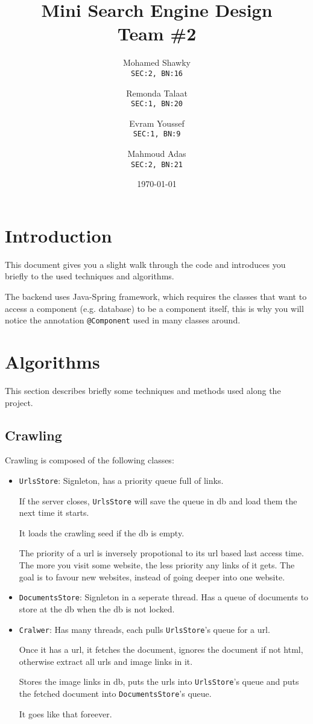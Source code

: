 \documentclass[12pt]{article}
\title{\textbf{Mini Search Engine Design}\\Team \#2}
\author{
  Mohamed Shawky\\
  \small\texttt{SEC:2, BN:16}
  \and
  Remonda Talaat\\
  \small\texttt{SEC:1, BN:20}
  \and
  Evram Youssef\\
  \small\texttt{SEC:1, BN:9}
  \and
  Mahmoud Adas\\
  \small\texttt{SEC:2, BN:21}
}
\date{\today}
\begin{document}
\thispagestyle{empty}

\maketitle
\tableofcontents


\section{Introduction}
This document gives you a slight walk through the code and introduces you briefly to the used techniques and algorithms.

The backend uses Java-Spring framework, which requires the classes that want to access a component (e.g. database) to be a component itself, this is why you will notice the annotation \texttt{@Component} used in many classes around.

\section{Algorithms}
This section describes briefly some techniques and methods used along the project.

\subsection{Crawling}
Crawling is composed of the following classes:
\begin{itemize}
  \item \texttt{UrlsStore}: Signleton, has a priority queue full of links. 
  
  If the server closes, \texttt{UrlsStore} will save the queue in db and load them the next time it starts. 
  
  It loads the crawling seed if the db is empty.

  The priority of a url is inversely propotional to its url based last access time.
  The more you visit some website, the less priority any links of it gets. The goal is to favour new websites, instead of going deeper into one website.

  \item \texttt{DocumentsStore}: Signleton in a seperate thread.
  Has a queue of documents to store at the db when the db is not locked.

  \item \texttt{Cralwer}: Has many threads, each pulls \texttt{UrlsStore}'s queue for a url.
  
  Once it has a url, it fetches the document, ignores the document if not html, otherwise extract all urls and image links in it.

  Stores the image links in db, puts the urls into \texttt{UrlsStore}'s queue and puts the fetched document into \texttt{DocumentsStore}'s queue.

  It goes like that foreever.
\end{itemize}
\end{document}
